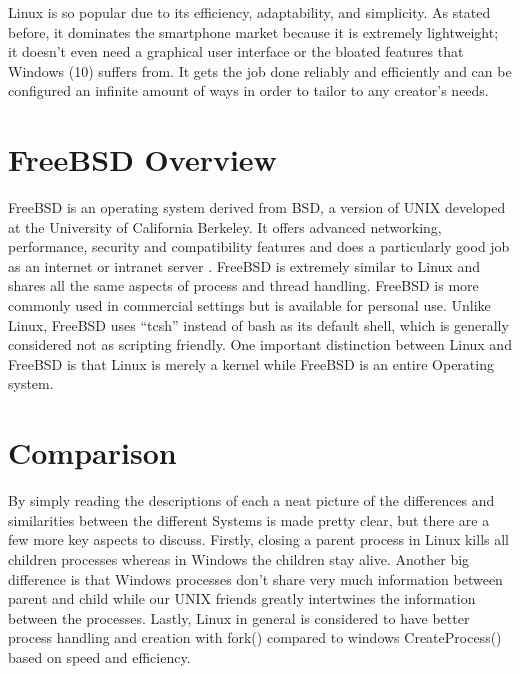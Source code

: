 \documentclass[onecolumn, draftclsnofoot,10pt, compsoc]{IEEEtran}
\begin{document}
	
	Linux is so popular due to its efficiency, adaptability, and simplicity. As stated before, it dominates the smartphone market because it is extremely lightweight; it doesn’t even need a graphical user interface or the bloated features that Windows (10) suffers from. It gets the job done reliably and efficiently and can be configured an infinite amount of ways in order to tailor to any creator’s needs. \\

\section{FreeBSD Overview}
	FreeBSD is an operating system derived from BSD, a version of UNIX developed at the University of California Berkeley. It offers advanced networking, performance, security and compatibility features and does a particularly good job as an internet or intranet server \cite{FreeBSD}. FreeBSD is extremely similar to Linux and shares all the same aspects of process and thread handling. FreeBSD is more commonly used in commercial settings but is available for personal use. Unlike Linux, FreeBSD uses “tcsh” instead of bash as its default shell, which is generally considered not as scripting friendly. One important distinction between Linux and FreeBSD is that Linux is merely a kernel while FreeBSD is an entire Operating system. \\
	
\section{Comparison}
By simply reading the descriptions of each a neat picture of the differences and similarities between the different Systems is made pretty clear, but there are a few more key aspects to discuss. Firstly, closing a parent process in Linux kills all children processes whereas in Windows the children stay alive. Another big difference is that Windows processes don’t share very much information between parent and child while our UNIX friends greatly intertwines the information between the processes. Lastly, Linux in general is considered to have better process handling and creation with fork() compared to windows CreateProcess() based on speed and efficiency. \\
\end{document}
